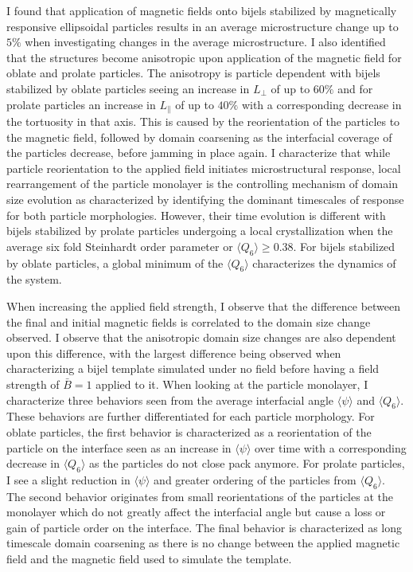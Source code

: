 I found that application of magnetic fields onto bijels stabilized by magnetically responsive ellipsoidal particles results in an average microstructure change up to 
$5\%$ when investigating changes in the average microstructure. I also identified that the structures become anisotropic upon application of the magnetic field for 
oblate and prolate particles. The anisotropy is particle dependent with bijels stabilized by oblate particles seeing an increase in $L_{\perp}$ of up to $60\%$ and for 
prolate particles an increase in $L_{\parallel}$ of up to $40\%$ with a corresponding decrease in the tortuosity in that axis. This is caused by the reorientation of the 
particles to the magnetic field, followed by domain coarsening as the interfacial coverage of the particles decrease, before jamming in place again. I characterize that 
while particle reorientation to the applied field initiates microstructural response, local rearrangement of the particle monolayer is the controlling mechanism of 
domain size evolution as characterized by identifying the dominant timescales 
of response for both particle morphologies. However, their time evolution is different with bijels stabilized by prolate particles undergoing a local crystallization when 
the average six fold Steinhardt order parameter or $\langle Q_6 \rangle \geq 0.38$. For bijels stabilized by oblate particles, a global minimum of the $\langle Q_6 \rangle$ 
characterizes the dynamics of the system.

When increasing the applied field strength, I observe that the difference between the final and initial magnetic fields is correlated to the domain size change observed. 
I observe that the anisotropic domain size changes are also dependent upon this difference, with the largest difference being observed when characterizing a bijel template 
simulated under no field before having a field strength of $\bar{B} = 1$ applied to it. When looking at the particle monolayer, I characterize three behaviors seen from the 
average interfacial angle $\langle \psi \rangle$ and $\langle Q_6 \rangle$. These behaviors are further differentiated for each particle morphology. For oblate particles, 
the first behavior is characterized as a reorientation of the particle on the interface seen as an increase in $\langle \psi \rangle$ over time with a corresponding decrease 
in $\langle Q_6 \rangle$ as the particles do not close pack anymore. For prolate particles, I see a slight reduction in $\langle \psi \rangle$ and greater ordering of the 
particles from $\langle Q_6 \rangle$. The second behavior originates from small reorientations of the particles at the monolayer which do not greatly affect the interfacial 
angle but cause a loss or gain of particle order on the interface. The final behavior is characterized as long timescale domain coarsening as there is no change between the 
applied magnetic field and the magnetic field used to simulate the template.

